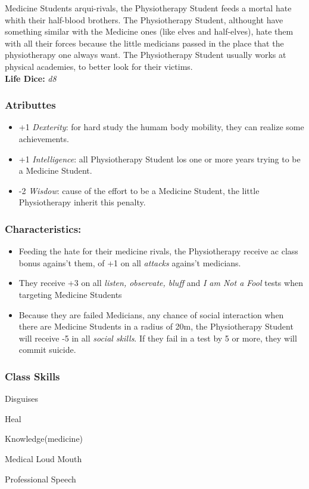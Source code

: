 \documentclass[ letterpaper,12pt]{article}
\begin{document}
{Medicine Students arqui-rivals, the Physiotherapy Student feeds a mortal hate whith their half-blood brothers. The Physiotherapy Student, althought have something similar with the Medicine ones (like elves and half-elves), hate them with all their forces because the little medicians passed in the place that the physiotherapy one always want. The Physiotherapy Student usually works at physical academies, to better look for their victims.\\

{\bf Life Dice:} {\it d8}

\subsubsection{Atributtes}
\begin{itemize}
\item{+1 {\it Dexterity}: for hard study the humam body mobility, they can realize some achievements.}
\item{+1 {\it Intelligence}: all Physiotherapy Student los one or more years trying to be a Medicine Student.}
\item{-2 {\it Wisdow}: cause of the effort to be a Medicine Student, the little Physiotherapy inherit this penalty.}
\end{itemize}

\subsubsection{Characteristics:}
\begin{itemize}
\item{Feeding the hate for their medicine rivals, the Physiotherapy receive  ac class bonus agains't them, of +1 on all {\it attacks} agains't medicians.}
\item{They receive +3 on all {\it listen, observate, bluff} and {\it I am Not a Fool} tests when targeting Medicine Students}
\item{Because they are failed Medicians, any chance of social interaction when there are Medicine Students in a radius of 20m, the Physiotherapy Student will receive -5 in all {\it social skills}. If they fail in a test by 5 or more, they will commit suicide.}
\end{itemize}

\subsubsection{Class Skills}
\begin{itemize}
{\it 
\item{Disguises}
\item{Heal}
\item{Knowledge(medicine)}
\item{Medical Loud Mouth}
\item{Professional Speech}
}
\end{itemize}

}
\end{document}
